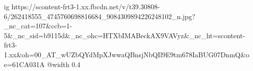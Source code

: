  
 
 
 
 

\ifcmt
  ig https://scontent-frt3-1.xx.fbcdn.net/v/t39.30808-6/262418555_4745760698816684_9084309894226248102_n.jpg?_nc_cat=107&ccb=1-5&_nc_sid=b9115d&_nc_ohc=HTXbIMABeckAX9VAVyz&_nc_ht=scontent-frt3-1.xx&oh=00_AT_wUZbQYdMpXJwwaQBnsjNbQIl9E9tm678IaBUG07DnmQ&oe=61CA031A
  @width 0.4
\fi
